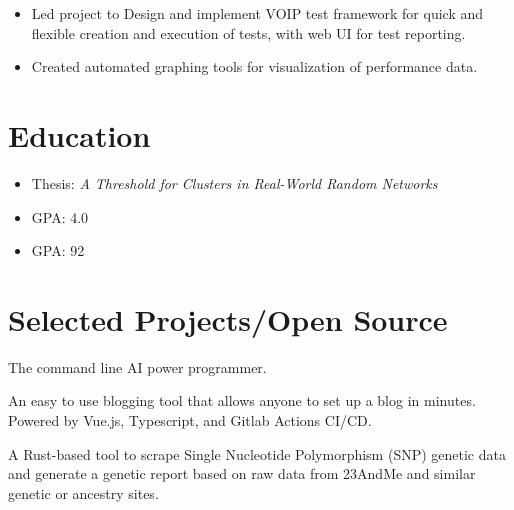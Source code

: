 \documentclass[11pt,a4paper,sans]{moderncv}
\begin{document}
{ \begin{itemize} \itemsep -1pt
  \item Led project to Design and implement VOIP test framework for quick and flexible creation and execution of tests, with web UI for test reporting.
  \item Created automated graphing tools for visualization of performance data.
\end{itemize} }

\section{\textbf{Education}}

{ \begin{itemize} \itemsep -1pt
  \item Thesis: \textit{A Threshold for Clusters in Real-World Random Networks}
  \item GPA: 4.0
\end{itemize} }

{ \begin{itemize} \itemsep -1pt
  \item GPA: 92
\end{itemize} }

\section{\textbf{Selected Projects/Open Source}}

  {The command line AI power programmer.}

  {An easy to use blogging tool that allows anyone to set up a blog in minutes. Powered by Vue.js, Typescript, and Gitlab Actions CI/CD.}

  {A Rust-based tool to scrape Single Nucleotide Polymorphism (SNP) genetic data and generate a genetic report based on raw data from 23AndMe and similar genetic or ancestry sites.}
\end{document}
